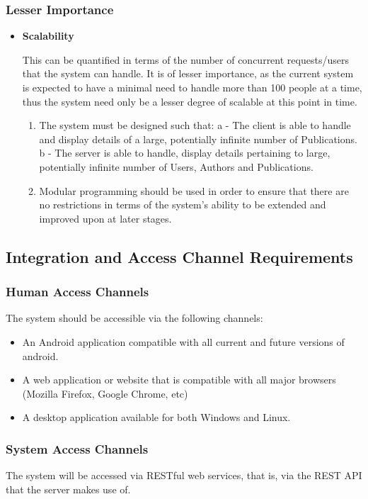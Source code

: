 \documentclass[hidelinks,a4paper,12pt]{article}
\begin{document}
		\subsubsection{Lesser Importance}
		\begin{itemize}
			\item \textbf{Scalability}
			
			This can be quantified in terms of the number of concurrent requests/users that the system can handle. It is of lesser importance, as the current system is expected to have a minimal need to handle more than 100 people at a time, thus the system need only be a lesser degree of scalable at this point in time.
			\begin{enumerate}
				\item The system must be designed such that:
				\newline
				a - The client is able to handle and display details of a large, potentially infinite number of Publications.\newline
				b - The server is able to handle, display details pertaining to large, potentially infinite number of Users, Authors and Publications.	
				\item Modular programming should be used in order to ensure that there are no restrictions in terms of the system's ability to be extended and improved upon at later stages.
			\end{enumerate}
		\end{itemize}
		
	\subsection{Integration and Access Channel Requirements}
	\subsubsection{Human Access Channels}
	The system should be accessible via the following channels:
	\begin{itemize}
		\item An Android application compatible with all current and future versions of android.
		\item A web application or website that is compatible with all major browsers (Mozilla Firefox, Google Chrome, etc)
		\item A desktop application available for both Windows and Linux.
	\end{itemize}
	
	\subsubsection{System Access Channels}
	The system will be accessed via RESTful web services, that is, via the REST API that the server makes use of.
	
\end{document}

